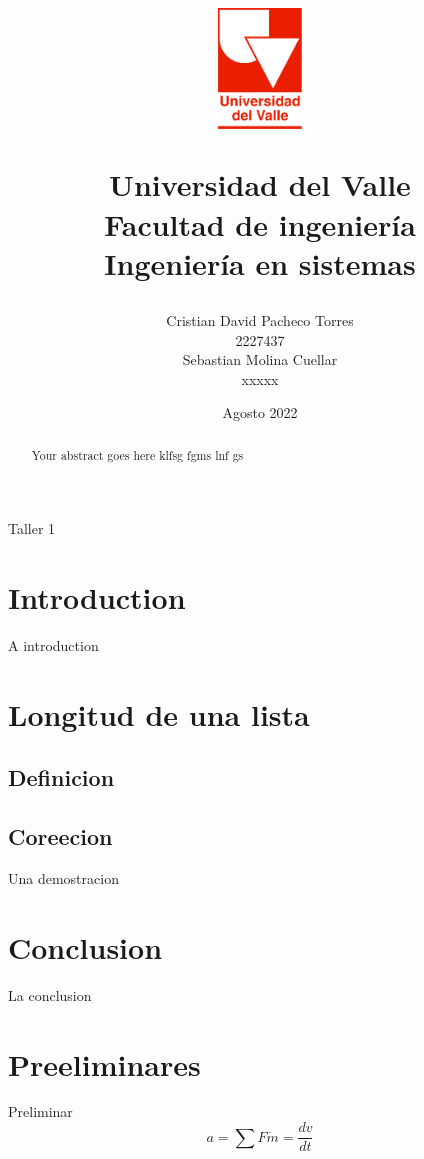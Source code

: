 \documentclass[12pt, a4paper]{article}
\title{
  \begin{figure}[th]
    \centering
    \includegraphics[width=0.2\textwidth]{Univalle}
  \end{figure}
  \textbf{Universidad del Valle
    \\{\Large Facultad de ingeniería}
  \\{\large Ingeniería en sistemas}}}
\author{Cristian David Pacheco Torres
  \\ 2227437
  \\ Sebastian Molina Cuellar
  \\ xxxxx}
\date{Agosto 2022}
\begin{document}
\maketitle
Taller 1
\newpage{}
\begin{abstract}
Your abstract goes here klfsg fgms lnf gs
\end{abstract}
\newpage{}
\tableofcontents
\newpage{}
\section{Introduction}
A introduction
\section{Longitud de una lista}
\subsection{Definicion}
\subsection{Coreecion}
Una demostracion
\section{Conclusion}
La conclusion

\newpage
\section{Preeliminares}
Preliminar
\begin{displaymath}
 a = \sum F \dot m = \frac{dv}{dt}
\end{displaymath}

 
\end{document}
